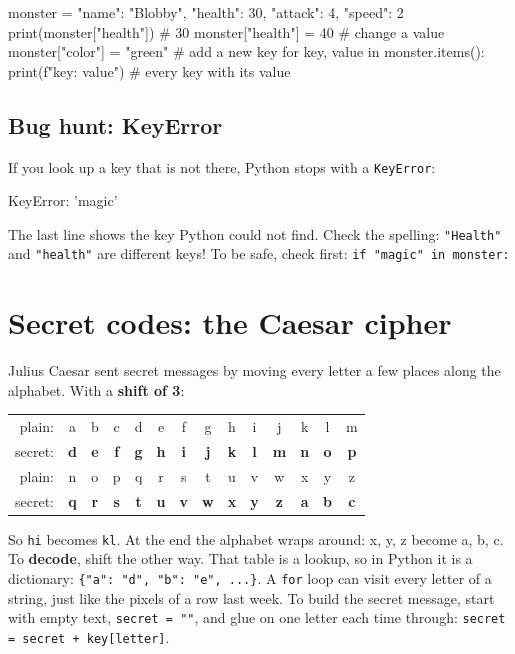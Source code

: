 \begin{pycode}
monster = {"name": "Blobby", "health": 30, "attack": 4, "speed": 2}
print(monster["health"])          # 30
monster["health"] = 40            # change a value
monster["color"] = "green"       # add a new key
for key, value in monster.items():
    print(f"{key}: {value}")      # every key with its value
\end{pycode}

\subsection{Bug hunt: KeyError}
If you look up a key that is not there, Python stops with a \texttt{KeyError}:
\begin{outputcode}
KeyError: 'magic'
\end{outputcode}
The last line shows the key Python could not find. Check the spelling: \texttt{"Health"} and \texttt{"health"} are different keys!
To be safe, check first: \texttt{if "magic" in monster:}

\section{Secret codes: the Caesar cipher}
Julius Caesar sent secret messages by moving every letter a few places along the alphabet. With a \textbf{shift of 3}:
\begin{center}
\setlength{\tabcolsep}{2.4pt}
\begin{tabular}{r*{13}{c}}
plain: & a & b & c & d & e & f & g & h & i & j & k & l & m \\
secret: & \textbf{d} & \textbf{e} & \textbf{f} & \textbf{g} & \textbf{h} & \textbf{i} & \textbf{j} & \textbf{k} & \textbf{l} & \textbf{m} & \textbf{n} & \textbf{o} & \textbf{p} \\[4pt]
plain: & n & o & p & q & r & s & t & u & v & w & x & y & z \\
secret: & \textbf{q} & \textbf{r} & \textbf{s} & \textbf{t} & \textbf{u} & \textbf{v} & \textbf{w} & \textbf{x} & \textbf{y} & \textbf{z} & \textbf{a} & \textbf{b} & \textbf{c} \\
\end{tabular}
\end{center}
So \texttt{hi} becomes \texttt{kl}. At the end the alphabet wraps around: x, y, z become a, b, c.
To \textbf{decode}, shift the other way. That table is a lookup, so in Python it is a dictionary: \texttt{\{"a": "d", "b": "e", ...\}}.
A \texttt{for} loop can visit every letter of a string, just like the pixels of a row last week. To build the secret message,
start with empty text, \texttt{secret = ""}, and glue on one letter each time through: \texttt{secret = secret + key[letter]}.

